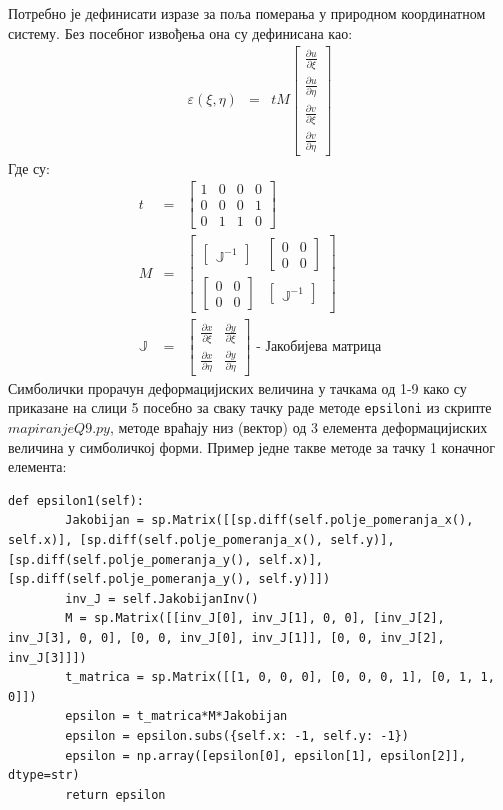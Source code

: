 \documentclass[11pt, a4paper]{article}
\begin{document}
Потребно је дефинисати изразе за поља померања у природном координатном систему. Без посебног извођења она су дефинисана као:
\begin{eqnarray}
\varepsilon(\xi, \eta) &=& t M 
\begin{bmatrix}
\frac{\partial u}{\partial \xi}\\
\frac{\partial u}{\partial \eta}\\
\frac{\partial v}{\partial \xi}\\
\frac{\partial v}{\partial \eta}
\end{bmatrix}
\end{eqnarray}
Где су:
\begin{eqnarray}
t &=& 
\begin{bmatrix}
1 & 0 & 0 & 0 \\
0 & 0 & 0 & 1\\
0 & 1 & 1 & 0
\end{bmatrix}
\\
M &=& 
\begin{bmatrix}
	\begin{bmatrix}
	\mathbb{J}^{-1}
	\end{bmatrix}
	&
	\begin{bmatrix}
	0 & 0 \\
	0 & 0
	\end{bmatrix}
	\\
	\begin{bmatrix}
	0 & 0 \\
	0 & 0
	\end{bmatrix}
	&
	\begin{bmatrix}
	\mathbb{J}^{-1}
	\end{bmatrix}
\end{bmatrix} \\
\mathbb{J} &=& 
\begin{bmatrix}
\frac{\partial x}{\partial \xi} & \frac{\partial y}{\partial \xi} \\
\frac{\partial x}{\partial \eta} & \frac{\partial y}{\partial \eta}
\end{bmatrix} \text{ - Јакобијева матрица}
\end{eqnarray}
Симболички прорачун деформацијиских величина у тачкама од 1-9 како су приказане на слици 5 посебно за сваку тачку раде методе \texttt{epsiloni} из скрипте $mapiranjeQ9.py$, методе враћају низ (вектор) од 3 елемента деформацијиских величина у симболичкој форми. Пример једне такве методе за тачку 1 коначног елемента:
\begin{lstlisting}
def epsilon1(self):
        Jakobijan = sp.Matrix([[sp.diff(self.polje_pomeranja_x(), self.x)], [sp.diff(self.polje_pomeranja_x(), self.y)], [sp.diff(self.polje_pomeranja_y(), self.x)], [sp.diff(self.polje_pomeranja_y(), self.y)]])
        inv_J = self.JakobijanInv()
        M = sp.Matrix([[inv_J[0], inv_J[1], 0, 0], [inv_J[2], inv_J[3], 0, 0], [0, 0, inv_J[0], inv_J[1]], [0, 0, inv_J[2], inv_J[3]]])
        t_matrica = sp.Matrix([[1, 0, 0, 0], [0, 0, 0, 1], [0, 1, 1, 0]])
        epsilon = t_matrica*M*Jakobijan
        epsilon = epsilon.subs({self.x: -1, self.y: -1})
        epsilon = np.array([epsilon[0], epsilon[1], epsilon[2]], dtype=str)
        return epsilon
\end{lstlisting}
\end{document}

